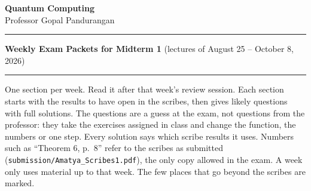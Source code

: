 \documentclass[a4paper,11pt,final]{article}
\theoremstyle{plain}
\theoremstyle{definition}
\begin{document}
\begin{center}
\textbf{\large Quantum Computing} \\

Professor Gopal Pandurangan\\
\vspace{0.1in}
\end{center}

\hrule

\vspace{0.1in}

\textbf{Weekly Exam Packets for Midterm 1} (lectures of August 25 -- October 8, 2026)

\vspace{0.1in}

\hrule

\vspace{0.1in}

One section per week. Read it after that week's review session. Each section starts with the
results to have open in the scribes, then gives likely questions with full solutions. The
questions are a guess at the exam, not questions from the professor: they take the exercises
assigned in class and change the function, the numbers or one step. Every solution says which
scribe results it uses. Numbers such as ``Theorem 6, p.~8'' refer to the scribes as submitted
(\texttt{submission/Amatya\_Scribes1.pdf}), the only copy allowed in the exam. A week only uses material up to that
week. The few places that go beyond the scribes are marked.

\tableofcontents

\clearpage


\clearpage

\clearpage

\clearpage

\clearpage

\clearpage

\clearpage

\end{document}
